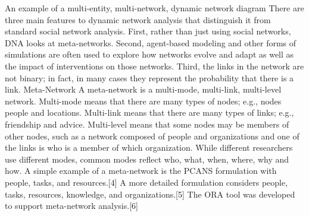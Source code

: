 An example of a multi-entity, multi-network, dynamic network diagram
There are three main features to dynamic network analysis that distinguish it from standard social network analysis. First, rather than just using social networks, DNA looks at meta-networks. Second, agent-based modeling and other forms of simulations are often used to explore how networks evolve and adapt as well as the impact of interventions on those networks. Third, the links in the network are not binary; in fact, in many cases they represent the probability that there is a link.
Meta-Network A meta-network is a multi-mode, multi-link, multi-level network. Multi-mode means that there are many types of nodes; e.g., nodes people and locations. Multi-link means that there are many types of links; e.g., friendship and advice. Multi-level means that some nodes may be members of other nodes, such as a network composed of people and organizations and one of the links is who is a member of which organization.
While different researchers use different modes, common modes reflect who, what, when, where, why and how. A simple example of a meta-network is the PCANS formulation with people, tasks, and resources.[4] A more detailed formulation considers people, tasks, resources, knowledge, and organizations.[5] The ORA tool was developed to support meta-network analysis.[6]
